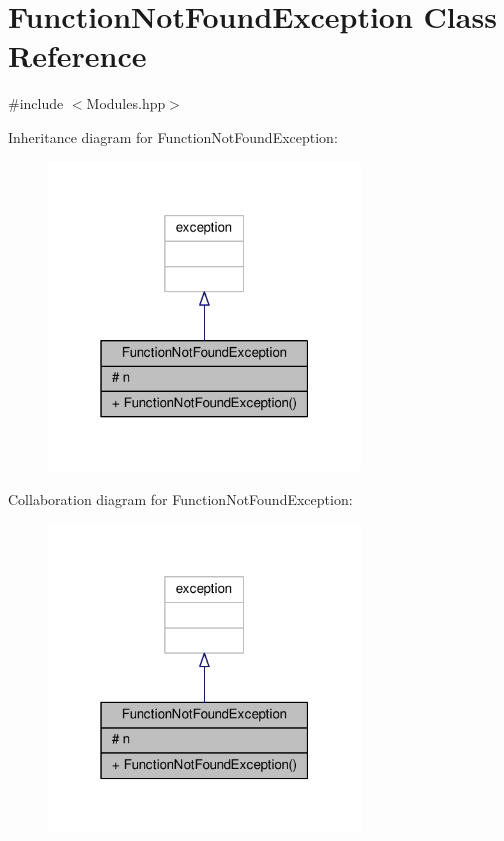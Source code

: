 \hypertarget{class_function_not_found_exception}{}\section{Function\+Not\+Found\+Exception Class Reference}
\label{class_function_not_found_exception}


{\ttfamily \#include $<$Modules.\+hpp$>$}



Inheritance diagram for Function\+Not\+Found\+Exception\+:\nopagebreak
\begin{figure}[H]
\begin{center}
\leavevmode
\includegraphics[width=235pt]{class_function_not_found_exception__inherit__graph}
\end{center}
\end{figure}


Collaboration diagram for Function\+Not\+Found\+Exception\+:\nopagebreak
\begin{figure}[H]
\begin{center}
\leavevmode
\includegraphics[width=235pt]{class_function_not_found_exception__coll__graph}
\end{center}
\end{figure}
